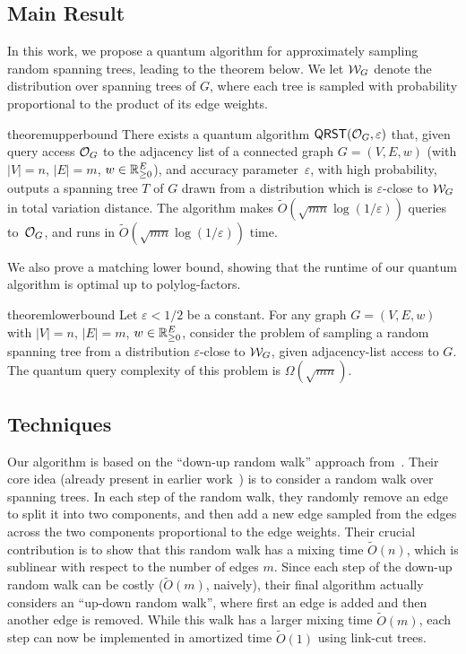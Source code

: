 \documentclass[11pt]{article}
\newcommand{\abss}[1]{\left\lvert #1 \right\rvert}
\newcommand{\parens}[1]{( #1 )}
\newcommand{\QRST}{\mathsf{QRST}} \newcommand{\RST}{\mathsf{RST}} \newcommand{\SubgraphConstruct}{\mathsf{SubgraphConstruct}} \newcommand{\QResistance}{\mathsf{QResistance}} \newcommand{\Label}{\mathsf{Label}} \newcommand{\QStoreTree}{\mathsf{QStoreTree}} \newcommand{\QMaxProductTree}{\mathsf{QMaxProductTree}} \newcommand{\QIsoSample}{\mathsf{QIsotropicSample}}
\begin{document}
{\subsection{Main Result}
In this work, we propose a quantum algorithm for approximately sampling random
spanning trees, leading to the theorem below.
We let $\mathcal{W}_G$ denote the distribution over spanning trees of $G$, where each
tree is sampled with probability proportional to the product of its edge
weights.

\begin{restatable}{theorem}{upperbound}\label{thm:quantum-algo-UST-informal}
  There exists a quantum algorithm $\QRST(\cO_G, \varepsilon)$ that, given query
  access $\mathcal{O}_G$ to the adjacency list of a connected graph $G = (V, E, w)$
  (with $\abss{V} = n$, $\abss{E} = m$, $w \in \mathbb{R}^E_{\geq 0}$), and accuracy
  parameter~$\varepsilon$, with high probability, outputs a spanning tree $T$ of
  $G$ drawn from a distribution which is $\varepsilon$-close to $\mathcal{W}_G$ in total
  variation distance.
  The algorithm makes $\widetilde{O}(\sqrt{mn} \log(1/\varepsilon))$ queries
  to~$\mathcal{O}_G$, and runs in $\widetilde{O}(\sqrt{mn}\log(1/\varepsilon))$ time.
\end{restatable}

We also prove a matching lower bound, showing that the runtime of our quantum algorithm is optimal up to polylog-factors.

\begin{restatable}{theorem}{lowerbound}
\label{thm:lower-bound}
Let $\varepsilon < 1/2$ be a constant.
For any graph $G=\parens{V,E,w}$ with $\abss{V}=n$, $\abss{E}=m$, $w \in \mathbb{R}^E_{\geq 0}$, consider the problem of sampling a random spanning tree from a distribution $\varepsilon$-close to $\mathcal{W}_G$, given adjacency-list access to $G$. The quantum query complexity of this problem is $\Omega\parens{\sqrt{mn}}$.
\end{restatable}


\subsection{Techniques}
Our algorithm is based on the ``down-up random walk'' approach
from~\cite{anari2021log}.
Their core idea (already present in earlier work~\cite{russo2018linking}) is to
consider a random walk over spanning trees.
In each step of the random walk, they randomly remove an edge to split it into
two components, and then add a new edge sampled from the edges across the two
components proportional to the edge weights.
Their crucial contribution is to show that this random walk has a 
mixing time $\widetilde O(n)$, which is sublinear with respect to the number of edges $m$.
Since each step of the down-up random walk can be costly ($\widetilde O(m)$,
naively), their final algorithm actually considers an ``up-down random walk'',
where first an edge is added and then another edge is removed.
While this walk has a larger mixing time $\widetilde O(m)$, each step can now be
implemented in amortized time $\widetilde O(1)$ using link-cut trees.

}
\end{document}
